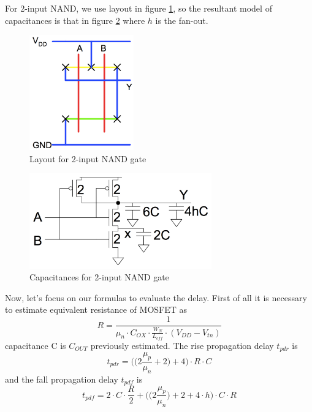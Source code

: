For 2-input NAND, we use layout in figure \ref{fig:nand_2_layout}, so the resultant model of capacitances is that in figure \ref{fig:nand_2} where $h$ is the fan-out.
\begin{figure}[htbp]
\begin{center}
\includegraphics[width=0.4\textwidth]{img/nand_2_layout.jpg}
\caption{Layout for 2-input NAND gate}
\label{fig:nand_2_layout}
\end{center}
\end{figure}
\begin{figure}[htbp]
\begin{center}
\includegraphics[width=0.7\textwidth]{img/nand_2.jpg}
\caption{Capacitances for 2-input NAND gate}
\label{fig:nand_2}
\end{center}
\end{figure}
Now, let's focus on our formulas to evaluate the delay. First of all it is necessary to estimate equivalent resistance of MOSFET as
\begin{equation}
R=\frac{1}{\mu_n \cdotp C_{OX} \cdotp \frac{W_N}{L_{eff}}\cdotp (V_{DD}-V_{tn})}
\end{equation}
capacitance C is $C_{OUT}$ previously estimated. The rise propagation delay $t_{pdr}$ is
\begin{equation}
t_{pdr}=\biggl(\biggl(2\frac{\mu_p}{\mu_n}+2\biggr)+4\biggr)\cdotp R \cdotp C
\end{equation}
and the fall propagation delay $t_{pdf}$ is
\begin{equation}
t_{pdf}=2\cdotp C \cdotp \frac{R}{2} + \biggl(\biggl(2\frac{\mu_p}{\mu_n}\biggr) + 2 + 4\cdotp h\biggr) \cdotp C \cdotp R
\end{equation}